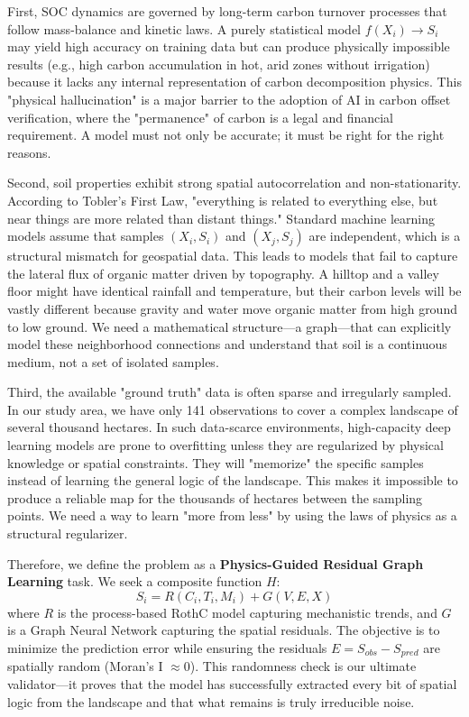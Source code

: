 \documentclass[conference]{IEEEtran}
\begin{document}
First, SOC dynamics are governed by long-term carbon turnover processes that follow mass-balance and kinetic laws. A purely statistical model $f(X_i) \to S_i$ may yield high accuracy on training data but can produce physically impossible results (e.g., high carbon accumulation in hot, arid zones without irrigation) because it lacks any internal representation of carbon decomposition physics. This "physical hallucination" is a major barrier to the adoption of AI in carbon offset verification, where the "permanence" of carbon is a legal and financial requirement. A model must not only be accurate; it must be right for the right reasons.

Second, soil properties exhibit strong spatial autocorrelation and non-stationarity. According to Tobler’s First Law, "everything is related to everything else, but near things are more related than distant things." Standard machine learning models assume that samples $(X_i, S_i)$ and $(X_j, S_j)$ are independent, which is a structural mismatch for geospatial data. This leads to models that fail to capture the lateral flux of organic matter driven by topography. A hilltop and a valley floor might have identical rainfall and temperature, but their carbon levels will be vastly different because gravity and water move organic matter from high ground to low ground. We need a mathematical structure—a graph—that can explicitly model these neighborhood connections and understand that soil is a continuous medium, not a set of isolated samples.

Third, the available "ground truth" data is often sparse and irregularly sampled. In our study area, we have only 141 observations to cover a complex landscape of several thousand hectares. In such data-scarce environments, high-capacity deep learning models are prone to overfitting unless they are regularized by physical knowledge or spatial constraints. They will "memorize" the specific samples instead of learning the general logic of the landscape. This makes it impossible to produce a reliable map for the thousands of hectares between the sampling points. We need a way to learn "more from less" by using the laws of physics as a structural regularizer.

Therefore, we define the problem as a \textbf{Physics-Guided Residual Graph Learning} task. We seek a composite function $H$:
\begin{equation}
S_i = R(C_i, T_i, M_i) + G(V, E, X)
\end{equation}
where $R$ is the process-based RothC model capturing mechanistic trends, and $G$ is a Graph Neural Network capturing the spatial residuals. The objective is to minimize the prediction error while ensuring the residuals $E = S_{obs} - S_{pred}$ are spatially random (Moran’s I $\approx 0$). This randomness check is our ultimate validator—it proves that the model has successfully extracted every bit of spatial logic from the landscape and that what remains is truly irreducible noise.
\end{document}
